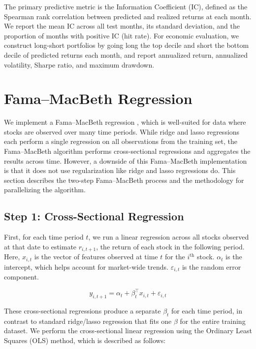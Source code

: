 \documentclass[11pt]{article}
\begin{document}
The primary predictive metric is the Information Coefficient (IC), defined as the Spearman rank correlation between predicted and realized returns at each month. We report the mean IC across all test months, its standard deviation, and the proportion of months with positive IC (hit rate). For economic evaluation, we construct long-short portfolios by going long the top decile and short the bottom decile of predicted returns each month, and report annualized return, annualized volatility, Sharpe ratio, and maximum drawdown.

\section{Fama--MacBeth Regression}
\label{sec:fama_macbeth}

We implement a Fama--MacBeth regression \cite{fama1973}, which is well-suited for data where stocks are observed over many time periods. While ridge and lasso regressions each perform a single regression on all observations from the training set, the Fama--MacBeth algorithm performs cross-sectional regressions and aggregates the results across time. However, a downside of this Fama--MacBeth implementation is that it does not use regularization like ridge and lasso regressions do. This section describes the two-step Fama--MacBeth process and the methodology for parallelizing the algorithm.

\subsection{Step 1: Cross-Sectional Regression}

First, for each time period $t$, we run a linear regression across all stocks observed at that date to estimate $r_{i,t+1}$, the return of each stock in the following period. Here, $x_{i,t}$ is the vector of features observed at time $t$ for the $i^{\text{th}}$ stock. $\alpha_t$ is the intercept, which helps account for market-wide trends. $\varepsilon_{i,t}$ is the random error component.

\begin{equation}
    y_{i,t+1} = \alpha_t + \beta_{t}^{\intercal} x_{i,t} + \varepsilon_{i,t}
\end{equation}

These cross-sectional regressions produce a separate $\beta_t$ for each time period, in contrast to standard ridge/lasso regression that fits one $\beta$ for the entire training dataset. We perform the cross-sectional linear regression using the Ordinary Least Squares (OLS) method, which is described as follows:
\end{document}

